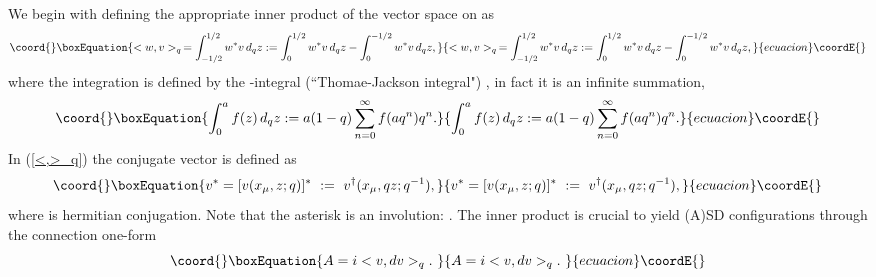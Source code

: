 \documentclass[a4paper,10pt]{article}
\providecommand{\qinv}{q^{-1}}
\begin{document}
We begin with defining the appropriate inner product \coordHE{} of the \coordHE{} vector space on \coordHE{} as
\begin{equation}\coord{}\boxEquation{
<w,v>_q\,=\int^{1/2}_{-1/2}w^* v \,d_qz:= \int^{1/2}_0w^* v \,d_qz-\int^{-1/2}_0w^* v \,d_qz, \label{<,>_q}
}{
<w,v>_q\,=\int^{1/2}_{-1/2}w^* v \,d_qz:= \int^{1/2}_0w^* v \,d_qz-\int^{-1/2}_0w^* v \,d_qz, }{ecuacion}\coordE{}\end{equation}
where the integration is defined by the \coordHE{}-integral (``Thomae-Jackson integral") \cite{GR}, in fact it is an infinite summation,
\begin{equation}\coord{}\boxEquation{
\int^{a}_0f(z)\,d_qz:=a(1-q)\sum^\infty_{n=0}f(aq^n)q^n. \label{DefTJ}
}{
\int^{a}_0f(z)\,d_qz:=a(1-q)\sum^\infty_{n=0}f(aq^n)q^n. }{ecuacion}\coordE{}\end{equation} 
In (\ref{<,>_q}) the conjugate vector \coordHE{} is defined as
\begin{equation}\coord{}\boxEquation{
v^*=[v(x_\mu,z;q)]^*\ :=\ v^\dagger(x_\mu,qz;\qinv), \label{*}
}{
v^*=[v(x_\mu,z;q)]^*\ :=\ v^\dagger(x_\mu,qz;\qinv), }{ecuacion}\coordE{}\end{equation}
where \myHighlight{$\dagger$}\coordHE{} is hermitian conjugation.
Note that the asterisk is an involution: \coordHE{}.
The inner product is crucial to yield (A)SD configurations through the connection one-form
\begin{equation}\coord{}\boxEquation{
A=i<v,dv>_q.\
}{
A=i<v,dv>_q.\
}{ecuacion}\coordE{}\end{equation}
\end{document}
